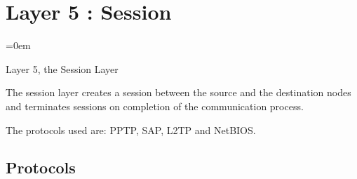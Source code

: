 
\section{Layer 5 : Session}
\label{sec:layer_5_session}
\parindent=0em

Layer 5, the Session Layer

The session layer creates a session between the source and the destination nodes and terminates sessions on completion of the communication process.

The protocols used are: PPTP, SAP, L2TP and NetBIOS.
\subsection{Protocols}
\label{ssec:protocols}


\subsectionend

\sectionend
